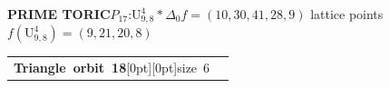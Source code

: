 \documentclass[14pt]{extarticle}
\makeatletter
\newcommand{\AtlasSupportOrbitSplit}[2]{%
  \begin{tabularx}{\linewidth}[t]{%
    @{}>{\raggedright\arraybackslash}p{.37\linewidth}%
    @{\hspace{2.5mm}\AtlasOrbitDivider\hspace{2.5mm}}%
    >{\raggedright\arraybackslash}X@{}}%
    \begin{minipage}[t]{\linewidth}\vspace{0pt}#1\end{minipage} &
    \begin{minipage}[t]{\linewidth}\vspace{0pt}#2\end{minipage}
  \end{tabularx}}
\makeatother
\begin{document}
\begin{atlasbox}\begin{atlaspanel}
\textcolor{toricgreen}{\bfseries PRIME TORIC}\quad \(P_{17}\):\enspace \(\mathrm{U}^{4}_{9,8}\ast\Delta_{0}\)\quad \(f=(10,30,41,28,9)\) lattice points\quad \(f(\mathrm{U}^{4}_{9,8})=(9,21,20,8)\)
\end{atlaspanel}\end{atlasbox}
\clearpage
\begin{atlaspanel}[top=1mm,bottom=2mm]
\AtlasSupportOrbitSplit{%
\vspace*{-3mm}\mbox{{\LARGE\bfseries Triangle orbit 18}\hspace{3mm}\raisebox{.8mm}[0pt][0pt]{{\fontsize{16}{18}\selectfont\color{muted}size 6}}}%
}{%
\vspace*{-3mm}{\fontsize{13}{16}\selectfont{\color{animalblue}\bfseries\(\mathbb{F}_2\) only}\quad{\color{muted}\(\underline{\{9,\,40,\,52\}}\), \(\{6,\,9,\,52\}\), \(\{12,\,30,\,53\}\), \(\{11,\,30,\,53\}\), \(\{10,\,41,\,54\}\), \(\{7,\,10,\,54\}\)}\rule[-3mm]{0pt}{3mm}}%
}%
\end{atlaspanel}\vspace{2mm}
\end{document}
